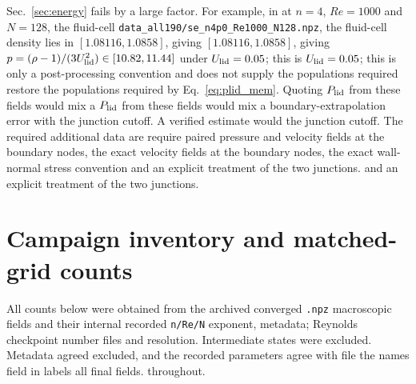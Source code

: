 \documentclass[11pt]{article}
\begin{document}
\color{revred}Sec.~\ref{sec:energy} fails by a \color{black}large factor. For example, \color{revred}in \color{revblue}at $n=4$, $Re=1000$ and $N=128$, the fluid-cell\color{black}
\color{revred}\texttt{data\_all190/se\_n4p0\_Re1000\_N128.npz}, the fluid-cell \color{black}density lies in\color{revblue} $[1.08116,1.0858]$, giving\color{black}
\color{revred}$[1.08116,1.0858]$, giving \color{black}$p=(\rho-1)/(3U_{\rm lid}^2)\in[10.82,11.44]$ under\color{revblue} $U_{\rm lid}=0.05$; this is\color{black}
\color{revred}$U_{\rm lid}=0.05$; this is \color{black}only a post-processing convention and does not\color{revblue} supply the populations required\color{black}
\color{revred}restore the populations required \color{black}by Eq.~\eqref{eq:plid_mem}. Quoting\color{revblue} $P_{\rm lid}$ from these fields would mix a\color{black}
\color{revred}$P_{\rm lid}$ from these fields would mix a \color{black}boundary-extrapolation error with\color{revblue} the junction cutoff. A verified estimate would\color{black}
\color{revred}the junction cutoff. The required additional data are \color{revblue}require\color{black} paired pressure and\color{revblue} velocity fields at the boundary nodes, the exact\color{black}
\color{revred}velocity fields at the boundary nodes, the exact \color{black}wall-normal stress convention\color{revblue} and an explicit treatment of the two junctions.\color{black}
\color{revred}and an explicit treatment of the two junctions.
\color{black}

\section{Campaign inventory and matched-grid counts}
\label{sec:campaigns}

All counts below were obtained from the \color{revred}archived \color{revblue}converged\color{black} \color{revred}\texttt{.npz} \color{revblue}macroscopic\color{black} fields and their
\color{revred}internal \color{revblue}recorded\color{black} \color{revred}\texttt{n/Re/N} \color{revblue}exponent,\color{black} \color{revred}metadata; \color{revblue}Reynolds\color{black} \color{revred}checkpoint \color{revblue}number\color{black} \color{revred}files \color{revblue}and resolution. Intermediate states\color{black} were\color{revred} excluded. Metadata\color{black}
\color{revred}agreed \color{revblue}excluded, and the recorded parameters agree\color{black} with \color{revred}file \color{revblue}the\color{black} \color{revred}names \color{revblue}field\color{black} \color{revred}in \color{revblue}labels\color{black} \color{revred}all final fields. \color{revblue}throughout.\color{black}
\end{document}
